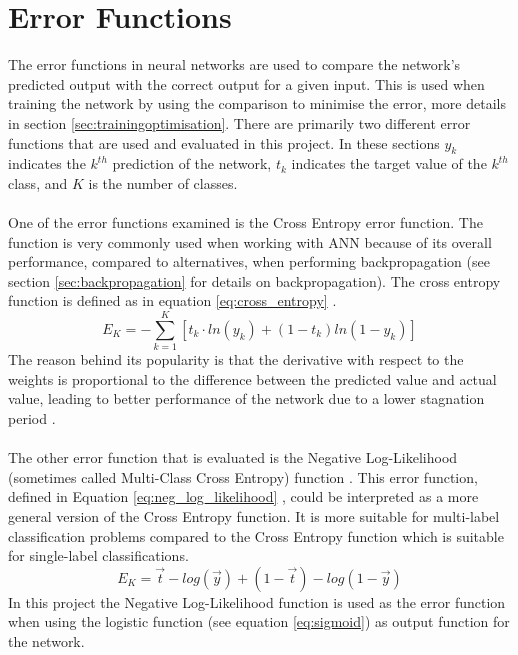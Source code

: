 \section{Error Functions} \label{errorfunction}
The error functions in neural networks are used to compare the network's predicted output with the correct output for a given input. This is used when training the network by using the comparison to minimise the error, more details in section \ref{sec:trainingoptimisation}. There are primarily two different error functions that are used and evaluated in this project. In these sections $y_k$ indicates the $k^{th}$ prediction of the network, $t_k$ indicates the target value of the $k^{th}$ class, and $K$ is the number of classes.
\\\\
One of the error functions examined is the Cross Entropy error function. The function is very commonly used when working with ANN because of its overall performance, compared to alternatives, when performing backpropagation (see section \ref{sec:backpropagation} for details on backpropagation). The cross entropy function is defined as in equation \ref{eq:cross_entropy} \parencite{bishop2006crossEn}.
\begin{equation} \label{eq:cross_entropy}
    E_K = -\sum_{k=1}^{K} [t_k \cdot ln(y_k) +(1-t_k)ln(1-y_k) ]
\end{equation}
The reason behind its popularity is that the derivative with respect to the weights is proportional to the difference between the predicted value and actual value, leading to better performance of the network due to a lower stagnation period \parencite{nasr2002cross}.
\\\\
The other error function that is evaluated is the Negative Log-Likelihood (sometimes called Multi-Class Cross Entropy) function \parencite{bishop2006pattern}. This error function, defined in Equation \ref{eq:neg_log_likelihood} \parencite{tensorflow2016cross}, could be interpreted as a more general version of the Cross Entropy function. It is more suitable for multi-label classification problems compared to the Cross Entropy function which is suitable for single-label classifications.
\begin{equation} \label{eq:neg_log_likelihood}
    E_K = \vec{t} -log(\vec{y}) + (1-\vec{t}) -log(1-\vec{y})
\end{equation}
In this project the Negative Log-Likelihood function is used as the error function when using the logistic function (see equation \ref{eq:sigmoid}) as output function for the network.

